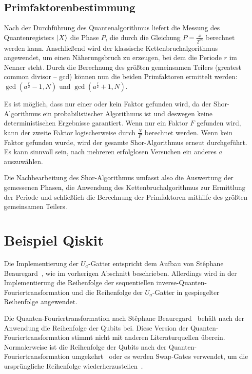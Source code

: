\documentclass[a4paper,journal]{IEEEtran}
\begin{document}
\subsection{Primfaktorenbestimmung}
Nach der Durchführung des Quantenalgorithmus liefert die Messung des Quantenregisters \(\ket{X}\) die Phase \(P\),
die durch die Gleichung \(P = \frac{x}{2^{2n}}\) berechnet werden kann.
Anschließend wird der klassische Kettenbruchalgorithmus angewendet,
um einen Näherungsbruch zu erzeugen, bei dem die Periode \(r\) im Nenner steht.
Durch die Berechnung des größten gemeinsamen Teilers (greatest common divisor -- gcd)
können nun die beiden Primfaktoren ermittelt werden:
\(\gcd(a^{\frac{r}{2}}-1, N)\) und \(\gcd(a^{\frac{r}{2}}+1, N)\).

Es ist möglich, dass nur einer oder kein Faktor gefunden wird,
da der Shor-Algorithmus ein probabilistischer Algorithmus ist und
deswegen keine deterministischen Ergebnisse garantiert.
Wenn nur ein Faktor \(F\) gefunden wird,
kann der zweite Faktor logischerweise durch \(\frac{N}{F}\) berechnet werden.
Wenn kein Faktor gefunden wurde, wird der gesamte Shor-Algorithmus erneut durchgeführt.
Es kann sinnvoll sein, nach mehreren erfolglosen Versuchen ein anderes \(a\) auszuwählen.~\cite{Mounica}

Die Nachbearbeitung des Shor-Algorithmus umfasst also die Auswertung der gemessenen Phasen,
die Anwendung des Kettenbruchalgorithmus zur Ermittlung der Periode und
schließlich die Berechnung der Primfaktoren mithilfe des größten gemeinsamen Teilers.

\section{Beispiel Qiskit}
Die Implementierung der \(U_a\)-Gatter entspricht dem Aufbau von
Stêphane Beauregard~\cite{beauregard2003circuit},
wie im vorherigen Abschnitt beschrieben.
Allerdings wird in der Implementierung die Reihenfolge
der sequentiellen inverse-Quanten-Fouriertransformation und
die Reihenfolge der \(U_a\)-Gatter in gespiegelter Reihenfolge angewendet.

Die Quanten-Fouriertransformation nach
Stêphane Beauregard~\cite{beauregard2003circuit} behält
nach der Anwendung die Reihenfolge der Qubits bei.
Diese Version der Quanten-Fouriertransformation stimmt nicht
mit anderen Literaturquellen überein.
Normalerweise ist die Reihenfolge der Qubits
nach der Quanten-Fouriertransformation umgekehrt~\cite{Hoever:QC,Young:QFT} oder
es werden Swap-Gates verwendet,
um die ursprüngliche Reihenfolge wiederherzustellen~\cite{IBM:QFT}.
\end{document}
